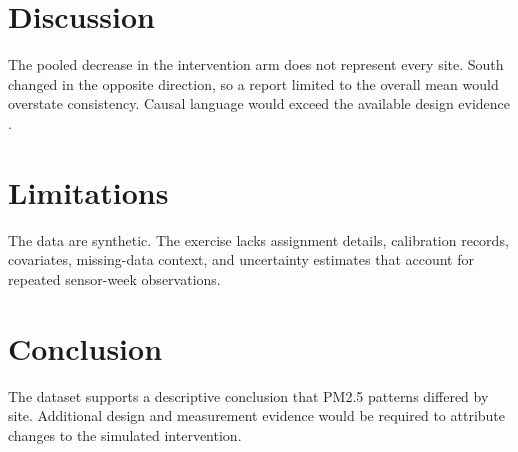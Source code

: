 \documentclass[11pt]{article}
\begin{document}
\section{Discussion}
The pooled decrease in the intervention arm does not represent every site. South changed in the opposite direction, so a report limited to the overall mean would overstate consistency. Causal language would exceed the available design evidence \citep{Diaz2025BeforeAfter}.

\section{Limitations}
The data are synthetic. The exercise lacks assignment details, calibration records, covariates, missing-data context, and uncertainty estimates that account for repeated sensor-week observations.

\section{Conclusion}
The dataset supports a descriptive conclusion that PM2.5 patterns differed by site. Additional design and measurement evidence would be required to attribute changes to the simulated intervention.



\end{document}
